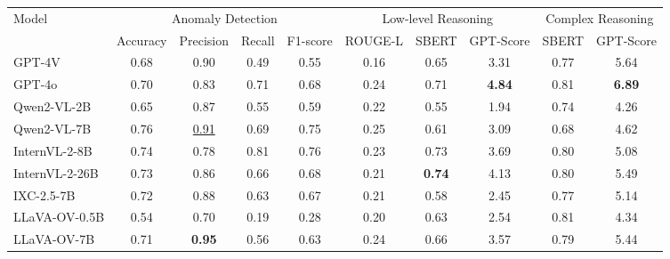 \begin{table*}
\small
\centering
\begin{tabular}{lccccccccc}
\toprule
\multicolumn{1}{l}{\multirow{2}{*}{Model}} & \multicolumn{4}{c}{Anomaly Detection} & \multicolumn{3}{c}{Low-level Reasoning} &  \multicolumn{2}{c}{Complex Reasoning}\\ 
\cmidrule(lr){2-5}\cmidrule(lr){6-8}\cmidrule(lr){9-10}
                 & Accuracy           & Precision & Recall & F1-score & ROUGE-L               & SBERT & GPT-Score & SBERT                & GPT-Score \\
\hline
GPT-4V \cite{gpt-api-4vision}          & 0.68              & 0.90      & 0.49   & 0.55     &        0.16             &   0.65    &      3.31     &  0.77                    &     5.64      \\
GPT-4o \cite{gpt-api-4o}          & 0.70              & 0.83      & 0.71   & 0.68     &           0.24          &    0.71   &    \textbf{4.84}       &  0.81                    &      \textbf{6.89}     \\
Qwen2-VL-2B \cite{qwen2vl}      & 0.65              & 0.87      & 0.55   & 0.59     & 0.22                    &   0.55    &  1.94         & 0.74                     &   4.26        \\
Qwen2-VL-7B \cite{qwen2vl}     & 0.76              & \underline{0.91}      & 0.69   & 0.75     & 0.25                    &  0.61     &  3.09         & 0.68                     &  4.62         \\
InternVL-2-8B \cite{internvl}   & 0.74              & 0.78      & 0.81   & 0.76     & 0.23                    & 0.73      &  3.69         & 0.80                     & 5.08          \\
InternVL-2-26B \cite{internvl}  & 0.73              & 0.86      & 0.66   & 0.68     & 0.21                    & \textbf{0.74}      &  4.13         & 0.80                     &   5.49        \\
IXC-2.5-7B \cite{ixc25}      & 0.72              & 0.88      & 0.63   & 0.67     & 0.21                    &  0.58     &  2.45         & 0.77                     &   5.14        \\
LLaVA-OV-0.5B \cite{llavaonevision}   & 0.54              & 0.70      & 0.19   & 0.28     & 0.20                    & 0.63      &  2.54         & 0.81                     &   4.34        \\
LLaVA-OV-7B \cite{llavaonevision}     & 0.71              & \textbf{0.95}      & 0.56   & 0.63     & 0.24                    & 0.66      &  3.57         &   0.79                   &  5.44         \\

\end{tabular}
\end{table*}
